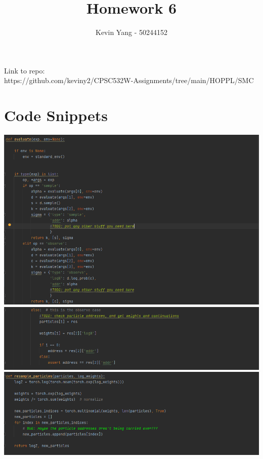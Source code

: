 \documentclass[10pt]{homeworg}
\title{Homework 6}
\author{Kevin Yang - 50244152}
\begin{document}
\maketitle

\Huge{Link to repo:}\\
\small{https://github.com/keviny2/CPSC532W-Assignments/tree/main/HOPPL/SMC}

\section*{Code Snippets}
\begin{center}
\includegraphics[scale=0.5]{figures/sample_observe.png}
\vspace{1cm}
\includegraphics[scale=0.5]{figures/smc_observe.png}
\vspace{-1cm}
\includegraphics[scale=0.5]{figures/resample_particles.png}
\end{center}
\end{document}
